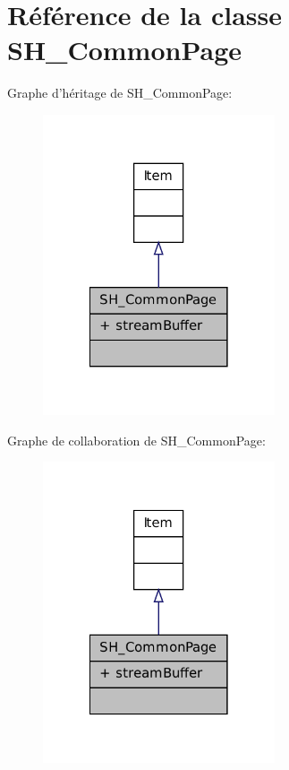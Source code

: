 \hypertarget{classSH__CommonPage}{\section{Référence de la classe S\-H\-\_\-\-Common\-Page}
\label{classSH__CommonPage}
}


Graphe d'héritage de S\-H\-\_\-\-Common\-Page\-:\nopagebreak
\begin{figure}[H]
\begin{center}
\leavevmode
\includegraphics[width=194pt]{classSH__CommonPage__inherit__graph}
\end{center}
\end{figure}


Graphe de collaboration de S\-H\-\_\-\-Common\-Page\-:\nopagebreak
\begin{figure}[H]
\begin{center}
\leavevmode
\includegraphics[width=194pt]{classSH__CommonPage__coll__graph}
\end{center}
\end{figure}
